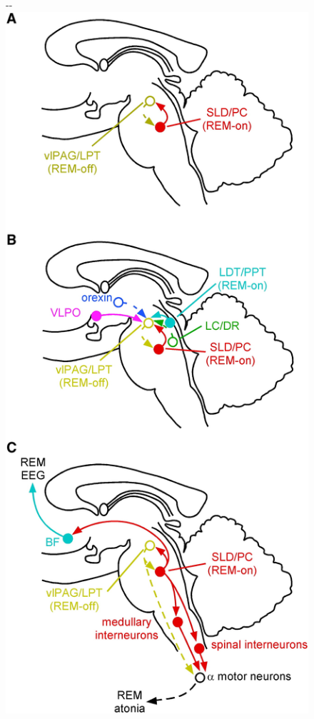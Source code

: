             \begin{figure}
                \begin{adjustwidth*}{}{-\marginparwidth-\marginparsep}
                \centering
                \includegraphics[height=0.775\textheight]{figures/clinical-background/SleepStateSwitching/Figure2.png}

\end{adjustwidth*}
\end{figure}
